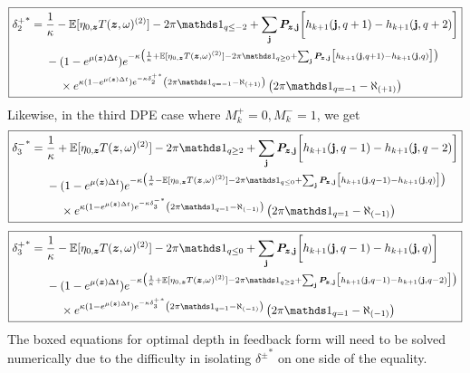 \begin{equation}
\label{eq:discretedeltaplus2feedback}
\boxed{
\begin{split}
{\delta_{2}^+}^* & = \frac{1}{\kappa} - \E[\eta_{0,\bz} T(\bz, \omega)^{(2)}] - 2 \pi \indicator_{q \leq -2} + \sum_\bj \bP_{\bz,\bj} \biggl[ h_{k+1}(\bj, q+1) - h_{k+1}(\bj, q+2) \biggr] \\
& \hphantom{{}={}} - (1-e^{\mu (\bz) \Delta t})e^{-\kappa \bigl( \frac{1}{\kappa} + \E[\eta_{0,\bz} T(\bz, \omega)^{(2)}] - 2 \pi \indicator_{q \geq 0} + \sum_\bj \bP_{\bz,\bj} \bigl[ h_{k+1}(\bj, q+1) - h_{k+1}(\bj, q) \bigr] \bigr) } \\
& \hphantom{{}={} {}-{}} \times e^{\kappa (1-e^{\mu (\bz) \Delta t})e^{-\kappa {\delta_{2}^+}^*} \left( 2 \pi \indicator_{q = -1} - \aleph_{(+1)} \right)} \left( 2 \pi \indicator_{q = -1} - \aleph_{(+1)} \right)
\end{split}
}
\end{equation}
Likewise, in the third DPE case where $M_k^+ =0, M_k^-=1$, we get
\begin{equation}
\label{eq:discretedeltaminus3feedback}
\boxed{
\begin{split}
{\delta_{3}^-}^* & = \frac{1}{\kappa} + \E[\eta_{0,\bz} T(\bz, \omega)^{(2)}] - 2 \pi \indicator_{q \geq 2} + \sum_\bj \bP_{\bz,\bj} \biggl[ h_{k+1}(\bj, q-1) - h_{k+1}(\bj, q-2) \biggr] \\
& \hphantom{{}={}} - (1-e^{\mu (\bz) \Delta t})e^{-\kappa \bigl( \frac{1}{\kappa} - \E[\eta_{0,\bz} T(\bz, \omega)^{(2)}] - 2 \pi \indicator_{q \leq 0} + \sum_\bj \bP_{\bz,\bj} \bigl[ h_{k+1}(\bj, q-1) - h_{k+1}(\bj, q) \bigr] \bigr) } \\
& \hphantom{{}={} {}-{}} \times e^{\kappa (1-e^{\mu (\bz) \Delta t})e^{-\kappa {\delta_{3}^-}^*} \left( 2 \pi \indicator_{q = 1} - \aleph_{(-1)} \right)} \left( 2 \pi \indicator_{q = 1} - \aleph_{(-1)} \right)
\end{split}
}
\end{equation}
\begin{equation}
\label{eq:discretedeltaplus3feedback}
\boxed{
\begin{split}
{\delta_{3}^+}^* & = \frac{1}{\kappa} - \E[\eta_{0,\bz} T(\bz, \omega)^{(2)}] - 2 \pi \indicator_{q \leq 0} + \sum_\bj \bP_{\bz,\bj} \biggl[ h_{k+1}(\bj, q-1) - h_{k+1}(\bj, q) \biggr] \\
& \hphantom{{}={}} - (1-e^{\mu (\bz) \Delta t})e^{-\kappa \bigl( \frac{1}{\kappa} + \E[\eta_{0,\bz} T(\bz, \omega)^{(2)}] - 2 \pi \indicator_{q \geq 2} + \sum_\bj \bP_{\bz,\bj} \bigl[ h_{k+1}(\bj, q-1) - h_{k+1}(\bj, q-2) \bigr] \bigr) } \\
& \hphantom{{}={} {}-{}} \times e^{\kappa (1-e^{\mu (\bz) \Delta t})e^{-\kappa {\delta_{3}^+}^*} \left( 2 \pi \indicator_{q = 1} - \aleph_{(-1)} \right)} \left( 2 \pi \indicator_{q = 1} - \aleph_{(-1)} \right)
\end{split}
}
\end{equation}
The boxed equations for optimal depth in feedback form will need to be solved numerically due to the difficulty in isolating ${\delta^{\pm}}^*$ on one side of the equality. 
